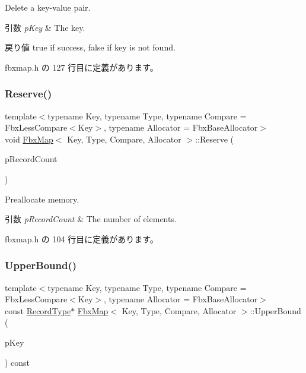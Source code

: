 Delete a key-\/value pair. 
\begin{DoxyParams}{引数}
{\em p\+Key} & The key. \\
\hline
\end{DoxyParams}
\begin{DoxyReturn}{戻り値}
{\ttfamily true} if success, {\ttfamily false} if key is not found. 
\end{DoxyReturn}


 fbxmap.\+h の 127 行目に定義があります。

\mbox{\label{class_fbx_map_ad9fcc220fda44cdd23ad848d1dcd5725}} 
\subsubsection{\texorpdfstring{Reserve()}{Reserve()}}
{\footnotesize\ttfamily template$<$typename Key, typename Type, typename Compare = Fbx\+Less\+Compare$<$\+Key$>$, typename Allocator = Fbx\+Base\+Allocator$>$ \\
void \hyperlink{class_fbx_map}{Fbx\+Map}$<$ Key, Type, Compare, Allocator $>$\+::Reserve (\begin{DoxyParamCaption}\item[{unsigned int}]{p\+Record\+Count }\end{DoxyParamCaption})\hspace{0.3cm}{\ttfamily [inline]}}

Preallocate memory. 
\begin{DoxyParams}{引数}
{\em p\+Record\+Count} & The number of elements. \\
\hline
\end{DoxyParams}


 fbxmap.\+h の 104 行目に定義があります。

\mbox{\label{class_fbx_map_a4ad230da7739de9f136a07d7565411ab}} 
\subsubsection{\texorpdfstring{Upper\+Bound()}{UpperBound()}\hspace{0.1cm}{\footnotesize\ttfamily [1/2]}}
{\footnotesize\ttfamily template$<$typename Key, typename Type, typename Compare = Fbx\+Less\+Compare$<$\+Key$>$, typename Allocator = Fbx\+Base\+Allocator$>$ \\
const \hyperlink{class_fbx_map_af8fc887461b3bf29f41aa36d15ddb54f}{Record\+Type}$\ast$ \hyperlink{class_fbx_map}{Fbx\+Map}$<$ Key, Type, Compare, Allocator $>$\+::Upper\+Bound (\begin{DoxyParamCaption}\item[{const \hyperlink{class_fbx_map_ad8392c83b6f8eeb9e0706bcc8674270a}{Key\+Type} \&}]{p\+Key }\end{DoxyParamCaption}) const\hspace{0.3cm}{\ttfamily [inline]}}


